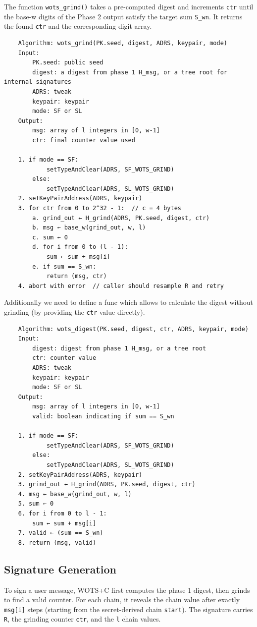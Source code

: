 The function \texttt{wots\_grind()} takes a pre-computed digest and increments \texttt{ctr} until the base-w digits of the Phase 2 output satisfy the target sum \texttt{S\_wn}. It returns the found \texttt{ctr} and the corresponding digit array.

\begin{verbatim}
    Algorithm: wots_grind(PK.seed, digest, ADRS, keypair, mode)
    Input:
        PK.seed: public seed
        digest: a digest from phase 1 H_msg, or a tree root for internal signatures
        ADRS: tweak
        keypair: keypair
        mode: SF or SL
    Output:
        msg: array of l integers in [0, w-1]
        ctr: final counter value used

    1. if mode == SF:
            setTypeAndClear(ADRS, SF_WOTS_GRIND)
        else:
            setTypeAndClear(ADRS, SL_WOTS_GRIND)
    2. setKeyPairAddress(ADRS, keypair)
    3. for ctr from 0 to 2^32 - 1:  // c = 4 bytes
        a. grind_out ← H_grind(ADRS, PK.seed, digest, ctr)
        b. msg ← base_w(grind_out, w, l)
        c. sum ← 0
        d. for i from 0 to (l - 1):
            sum ← sum + msg[i]
        e. if sum == S_wn:
            return (msg, ctr)
    4. abort with error  // caller should resample R and retry
\end{verbatim}

Additionally we need to define a func which allows to calculate the digest without grinding (by providing the \texttt{ctr} value directly).

\begin{verbatim}
    Algorithm: wots_digest(PK.seed, digest, ctr, ADRS, keypair, mode)
    Input:
        digest: digest from phase 1 H_msg, or a tree root
        ctr: counter value
        ADRS: tweak
        keypair: keypair
        mode: SF or SL
    Output:
        msg: array of l integers in [0, w-1]
        valid: boolean indicating if sum == S_wn

    1. if mode == SF:
            setTypeAndClear(ADRS, SF_WOTS_GRIND)
        else:
            setTypeAndClear(ADRS, SL_WOTS_GRIND)
    2. setKeyPairAddress(ADRS, keypair)
    3. grind_out ← H_grind(ADRS, PK.seed, digest, ctr)
    4. msg ← base_w(grind_out, w, l)
    5. sum ← 0
    6. for i from 0 to l - 1:
        sum ← sum + msg[i]
    7. valid ← (sum == S_wn)
    8. return (msg, valid)
\end{verbatim}

\subsection{Signature Generation}
To sign a user message, WOTS+C first computes the phase 1 digest, then grinds to find a valid counter. For each chain, it reveals the chain value after exactly \texttt{msg[i]} steps (starting from the secret-derived chain \texttt{start}). The signature carries \texttt{R}, the grinding counter \texttt{ctr}, and the \texttt{l} chain values.


